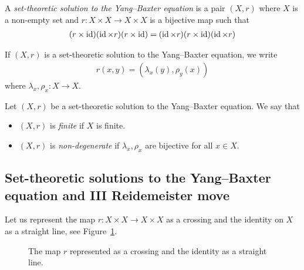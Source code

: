     \begin{definition}
        A \emph{set-theoretic solution to the Yang--Baxter equation} is a pair $(X,r)$ where $X$ is a non-empty set and $r: X\times X \to X \times X$ is a bijective map such that
        \begin{align}\label{eq:YBE}
            (r\times \operatorname{id})(\operatorname{id} \times r)(r\times \operatorname{id}) = (\operatorname{id} \times r)(r\times \operatorname{id})(\operatorname{id} \times r)
        \end{align}
    \end{definition}
    
    \begin{convention}
        If $(X,r)$ is a set-theoretic solution to the Yang--Baxter equation, we write 
        \begin{align*}
            r(x,y) = (\lambda_x(y),\rho_y(x))        
        \end{align*}
        where $\lambda_x,\rho_x:X\to X$.
    \end{convention}


    \begin{definition}
        Let $(X,r)$ be a set-theoretic solution to the  Yang--Baxter equation. We say that 
        \begin{itemize}
            \item $(X,r)$ is \emph{finite} if $X$ is finite.
            \item $(X,r)$ is \emph{non-degenerate} if $\lambda_x,\rho_x$ are bijective for all $x\in X$.
        \end{itemize}
    \end{definition}

\subsection{Set-theoretic solutions to the Yang--Baxter equation and III Reidemeister move}
    Let us represent the map $r:X \times X \to X \times X$ as a crossing and the identity on $X$ as a straight line, see Figure~\ref{fig:crossing}. 
    \begin{figure}[h!]
        \centering
        \caption{The map $r$ represented as a crossing and the identity as a straight line.}
        \label{fig:crossing}
    \end{figure}

